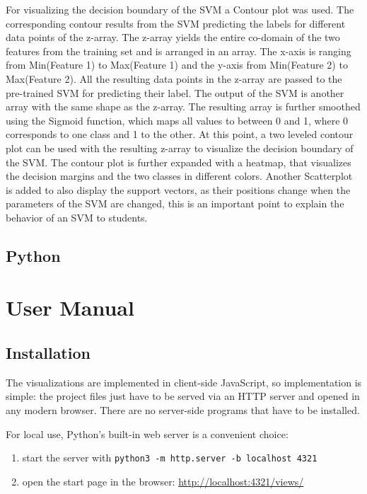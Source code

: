 \documentclass{scrartcl}
\begin{document}
For visualizing the decision boundary of the SVM a Contour plot was used. The corresponding contour results from the SVM predicting the labels for different data points of the z-array. The z-array yields the entire co-domain of the two features from the training set and is arranged in an array. The x-axis is ranging from Min(Feature 1) to Max(Feature 1) and the y-axis from Min(Feature 2) to Max(Feature 2). All the resulting data points in the z-array are passed to the pre-trained SVM for predicting their label. The output of the SVM is another array with the same shape as the z-array. The resulting array is further smoothed using the Sigmoid function, which maps all values to between 0 and 1, where 0 corresponds to one class and 1 to the other. 
At this point, a two leveled contour plot can be used with the resulting z-array  to visualize the decision boundary of the SVM. The contour plot is further expanded with a heatmap, that visualizes the decision margins and the two classes in different colors.
Another Scatterplot is added to also display the support vectors, as their positions change when the parameters of the SVM are changed, this is an important point to explain the behavior of an SVM to students.


\subsection{Python}

\section{User Manual}

\subsection{Installation}

The visualizations are implemented in client-side JavaScript,
so implementation is simple:
the project files just have to be served via an HTTP server
and opened in any modern browser.
There are no server-side programs that have to be installed.

For local use, Python's built-in web server is a convenient choice:

\begin{enumerate}
	\item start the server with \verb|python3 -m http.server -b localhost 4321|
	\item open the start page in the browser: \url{http://localhost:4321/views/}
\end{enumerate}
\end{document}
